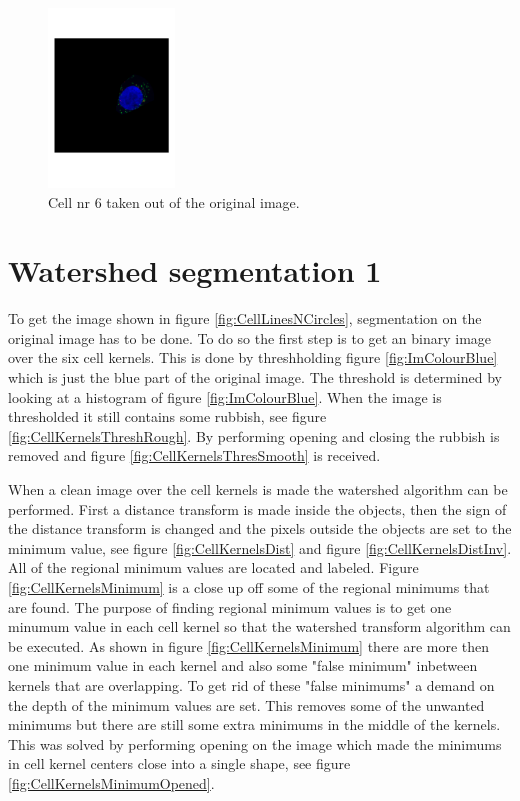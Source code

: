 \documentclass[10pt,twocolumn]{article}
\begin{document}
\begin{figure}[ht]
\centering
\includegraphics[width=0.3\textwidth]{Bilder/CellPart.pdf}
\caption{Cell nr 6 taken out of the original image.}
\label{fig:CellPart}
\end{figure}

%
%

\section{Watershed segmentation 1} \label{sec:WatSeg1}
To get the image shown in figure \ref{fig:CellLinesNCircles}, segmentation
on the original image has to be done. To do so the first step is to get an binary image over the
six cell kernels. This is done by threshholding figure \ref{fig:ImColourBlue} which is
just the blue part of the original image. The threshold is determined by looking at
a histogram of figure \ref{fig:ImColourBlue}. When the image is thresholded it still
contains some rubbish, see figure \ref{fig:CellKernelsThreshRough}. By performing
opening and closing the rubbish is removed and figure \ref{fig:CellKernelsThresSmooth} is received.

When a clean image over the cell kernels is made the watershed algorithm can be performed.
First a distance transform is made inside the objects, then the sign
of the distance transform is changed and the pixels outside the objects are set
to the minimum value, see figure \ref{fig:CellKernelsDist} and figure \ref{fig:CellKernelsDistInv}. All of the regional minimum values
are located and labeled. Figure \ref{fig:CellKernelsMinimum} is a close up off some of the regional minimums that are found.
The purpose of finding regional minimum values is to get one minumum value in each cell kernel so that
the watershed transform algorithm can be executed. As shown in figure \ref{fig:CellKernelsMinimum} there are
more then one minimum value in each kernel and also some "false minimum" inbetween kernels that are overlapping.
To get rid of these "false minimums" a demand on the depth of the minimum values are set. This removes some of the unwanted
minimums but there are still some extra minimums in the middle of the kernels. This
was solved by performing opening on the image which made the minimums in cell kernel centers close into a single shape,
see figure \ref{fig:CellKernelsMinimumOpened}.
\end{document}
